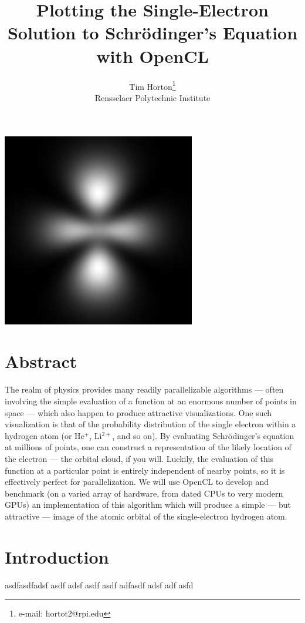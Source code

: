 \documentclass{acmsiggraph}
\title{Plotting the Single-Electron Solution to Schr\"{o}dinger's Equation with OpenCL}
\author{Tim Horton\thanks{e-mail: hortot2@rpi.edu}\\Rensselaer Polytechnic Institute}
\begin{document}
\maketitle

\includegraphics[width=84.5mm]{320.png}

\section{Abstract}

The realm of physics provides many readily parallelizable algorithms --- often involving the simple evaluation of a function at an enormous number of points in space --- which also happen to produce attractive visualizations. One such visualization is that of the probability distribution of the single electron within a hydrogen atom (or He$^+$, Li$^{2+}$, and so on). By evaluating Schr\"{o}dinger's equation at millions of points, one can construct a representation of the likely location of the electron --- the orbital cloud, if you will. Luckily, the evaluation of this function at a particular point is entirely independent of nearby points, so it is effectively perfect for parallelization. We will use OpenCL to develop and benchmark (on a varied array of hardware, from dated CPUs to very modern GPUs) an implementation of this algorithm which will produce a simple --- but attractive --- image of the atomic orbital of the single-electron hydrogen atom.

\section{Introduction}

asdfasdfadsf asdf adsf asdf asdf adfasdf adsf adf asfd
\end{document}
